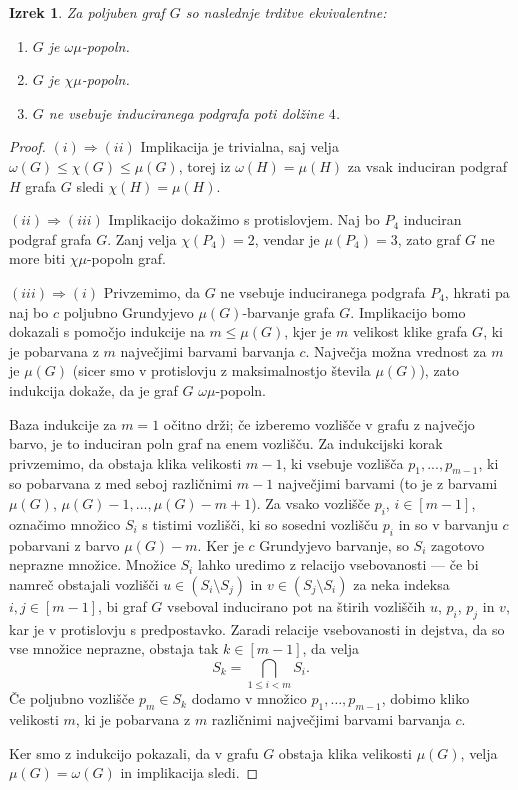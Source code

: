 \documentclass[12pt,a4paper,twoside]{article}
\theoremstyle{definition} %
\theoremstyle{plain} %
\newtheorem{izrek}[definicija]{Izrek}
\numberwithin{equation}{section}  %
\begin{document}
\begin{izrek}\label{grundyjevaKarakterizacija}
Za poljuben graf $G$ so naslednje trditve ekvivalentne:
\begin{enumerate}[label=(\roman*)]
\item $G$ je $\omega\mu$-popoln.
\item $G$ je $\chi\mu$-popoln.
\item $G$ ne vsebuje induciranega podgrafa poti dolžine $4$.
\end{enumerate}
\end{izrek}

\begin{proof} $(i) \Rightarrow (ii)$ Implikacija je trivialna, saj velja $\omega(G) \leq \chi(G) \leq \mu(G)$, torej iz $\omega(H) = \mu(H)$ za vsak induciran podgraf $H$ grafa $G$ sledi $\chi(H) = \mu(H)$.

\medskip
$(ii) \Rightarrow (iii)$ Implikacijo dokažimo s protislovjem. Naj bo $P_4$ induciran podgraf grafa $G$. Zanj velja $\chi(P_4)=2$, vendar je $\mu(P_4) = 3$, zato graf $G$ ne more biti $\chi\mu$-popoln graf.

\medskip
$(iii) \Rightarrow (i)$ Privzemimo, da $G$ ne vsebuje induciranega podgrafa $P_4$, hkrati pa naj bo $c$ poljubno Grundyjevo $\mu(G)$-barvanje grafa $G$. Implikacijo bomo dokazali s pomočjo indukcije na $m \leq \mu(G)$, kjer je $m$ velikost klike grafa $G$, ki je pobarvana z $m$ največjimi barvami barvanja $c$. Največja možna vrednost za $m$ je $\mu(G)$ (sicer smo v protislovju z maksimalnostjo števila $\mu(G)$), zato indukcija dokaže, da je graf $G$ $\omega\mu$-popoln.

Baza indukcije za $m=1$ očitno drži; če izberemo vozlišče v grafu z največjo barvo, je to induciran poln graf na enem vozlišču. Za indukcijski korak privzemimo, da obstaja klika velikosti $m-1$, ki vsebuje vozlišča $p_1, ..., p_{m-1}$, ki so pobarvana z med seboj različnimi $m-1$ največjimi barvami (to je z barvami $\mu(G)$, $\mu(G) - 1, \dots, \mu(G) - m + 1$). Za vsako vozlišče $p_i$, $i \in [m-1]$, označimo množico $S_i$ s tistimi vozlišči, ki so sosedni vozlišču $p_i$ in so v barvanju $c$ pobarvani z barvo $\mu(G) - m$. Ker je $c$ Grundyjevo barvanje, so $S_i$ zagotovo neprazne množice. Množice $S_i$ lahko uredimo z relacijo vsebovanosti --- če bi namreč obstajali vozlišči $u \in (S_i \setminus S_j)$ in $v\in (S_j \setminus S_i)$ za neka indeksa $i,j \in [m-1]$, bi graf $G$ vseboval inducirano pot na štirih vozliščih $u$, $p_i$, $p_j$ in $v$, kar je v protislovju s predpostavko. Zaradi relacije vsebovanosti in dejstva, da so vse množice neprazne, obstaja tak $k \in [m-1]$, da velja $$S_k = \bigcap_{1 \leq i < m} S_i.$$ Če poljubno vozlišče $p_m \in S_k$ dodamo v množico $p_1, \dots, p_{m-1}$, dobimo kliko velikosti $m$, ki je pobarvana z $m$ različnimi največjimi barvami barvanja $c$.

Ker smo z indukcijo pokazali, da v grafu $G$ obstaja klika velikosti $\mu(G)$, velja $\mu(G) = \omega(G)$ in implikacija sledi.\end{proof}
\end{document}
